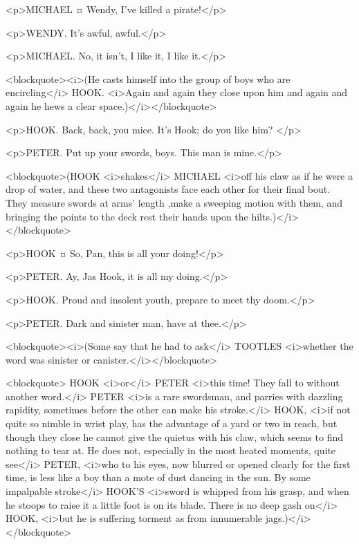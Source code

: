 <p>MICHAEL ¤
Wendy, I've killed a pirate!</p>

<p>WENDY. It's awful, awful.</p>

<p>MICHAEL. No, it isn't, I like it, I like it.</p>

<blockquote><i>(He casts himself into the group of boys who are encircling</i> HOOK. <i>Again and again they close upon him and again and again he hews a clear space.)</i></blockquote>

<p>HOOK. Back, back, you mice. It's Hook; do you like him?
</p>

<p>PETER. Put up your swords, boys. This man is mine.</p>

<blockquote>(HOOK <i>shakes</i> MICHAEL <i>off his claw as if he were a drop of water, and these two antagonists face each other for their final bout. They measure swords at arms' length ,make a sweeping motion with them, and bringing the points to the deck rest their hands upon the hilts.)</i></blockquote>

<p>HOOK ¤
So, Pan, this is all your doing!</p>

<p>PETER. Ay, Jas Hook, it is all my doing.</p>

<p>HOOK. Proud and insolent youth, prepare to meet thy doom.</p>

<p>PETER. Dark and sinister man, have at thee.</p>

<blockquote><i>(Some say that he had to ask</i> TOOTLES <i>whether the word was sinister or canister.</i></blockquote>

<blockquote> HOOK <i>or</i> PETER <i>this time! They fall to without another word.</i> PETER <i>is a rare swordsman, and parries with dazzling rapidity, sometimes before the other can make his stroke.</i> HOOK, <i>if not quite so nimble in wrist play, has the advantage of a yard or two in reach, but though they close he cannot give the quietus with his claw, which seems to find nothing to tear at. He does not, especially in the most heated moments, quite see</i> PETER, <i>who to his eyes, now blurred or opened clearly for the first time, is less like a boy than a mote of dust dancing in the sun. By some impalpable stroke</i> HOOK'S <i>sword is whipped from his grasp, and when he stoops to raise it a little foot is on its blade. There is no deep gash on</i> HOOK, <i>but he is suffering torment as from innumerable jags.)</i></blockquote>

